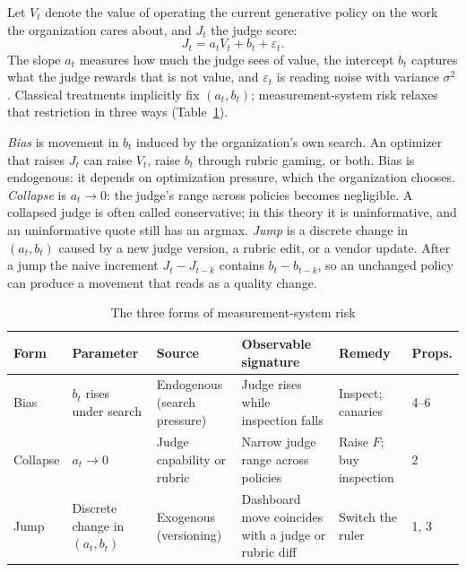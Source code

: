 \documentclass[acmsmall,screen,review]{acmart}
\theoremstyle{acmdefinition}
\begin{document}
Let $V_t$ denote the value of operating the current generative policy on the work the organization cares about, and $J_t$ the judge score:
\begin{equation}\label{eq:obs}
J_t = a_t V_t + b_t + \varepsilon_t .
\end{equation}
The slope $a_t$ measures how much the judge sees of value, the intercept $b_t$ captures what the judge rewards that is not value, and $\varepsilon_t$ is reading noise with variance $\sigma^2$. Classical treatments implicitly fix $(a_t,b_t)$; measurement-system risk relaxes that restriction in three ways (Table~\ref{tab:forms}).

\emph{Bias} is movement in $b_t$ induced by the organization's own search. An optimizer that raises $J_t$ can raise $V_t$, raise $b_t$ through rubric gaming, or both. Bias is endogenous: it depends on optimization pressure, which the organization chooses. \emph{Collapse} is $a_t \to 0$: the judge's range across policies becomes negligible. A collapsed judge is often called conservative; in this theory it is uninformative, and an uninformative quote still has an argmax. \emph{Jump} is a discrete change in $(a_t,b_t)$ caused by a new judge version, a rubric edit, or a vendor update. After a jump the naive increment $J_t - J_{t-k}$ contains $b_t - b_{t-k}$, so an unchanged policy can produce a movement that reads as a quality change.

\begin{table}[t]
\caption{The three forms of measurement-system risk}\label{tab:forms}
\small
\begin{tabular}{@{}p{1.2cm}p{2.0cm}p{2.1cm}p{3.1cm}p{2.3cm}p{1.0cm}@{}}
\toprule
Form & Parameter & Source & Observable signature & Remedy & Props. \\
\midrule
Bias & $b_t$ rises under search & Endogenous (search pressure) & Judge rises while inspection falls & Inspect; canaries & 4--6 \\
Collapse & $a_t \to 0$ & Judge capability or rubric & Narrow judge range across policies & Raise $F$; buy inspection & 2 \\
Jump & Discrete change in $(a_t,b_t)$ & Exogenous (versioning) & Dashboard move coincides with a judge or rubric diff & Switch the ruler & 1, 3 \\
\bottomrule
\end{tabular}
\end{table}
\end{document}
